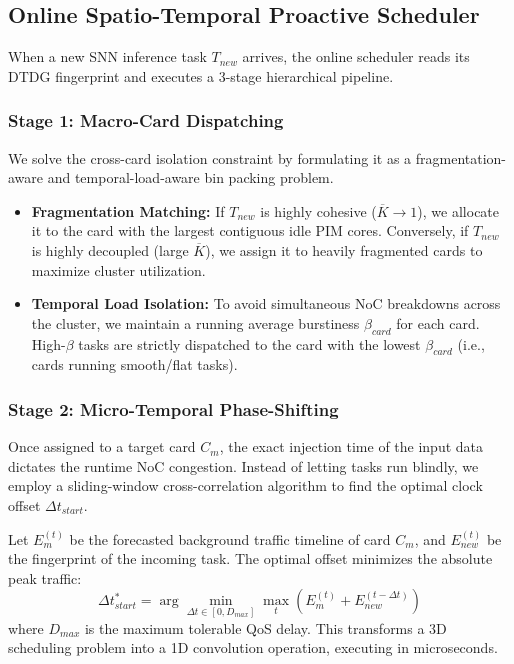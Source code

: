\documentclass[letterpaper,twocolumn,10pt]{article}
\begin{document}
\subsection{Online Spatio-Temporal Proactive Scheduler}
When a new SNN inference task $T_{new}$ arrives, the online scheduler reads its DTDG fingerprint and executes a 3-stage hierarchical pipeline.

\subsubsection{Stage 1: Macro-Card Dispatching}
We solve the cross-card isolation constraint by formulating it as a fragmentation-aware and temporal-load-aware bin packing problem.
\begin{itemize}
    \item \textbf{Fragmentation Matching:} If $T_{new}$ is highly cohesive ($\overline{K} \to 1$), we allocate it to the card with the largest contiguous idle PIM cores. Conversely, if $T_{new}$ is highly decoupled (large $\overline{K}$), we assign it to heavily fragmented cards to maximize cluster utilization.
    \item \textbf{Temporal Load Isolation:} To avoid simultaneous NoC breakdowns across the cluster, we maintain a running average burstiness $\beta_{card}$ for each card. High-$\beta$ tasks are strictly dispatched to the card with the lowest $\beta_{card}$ (i.e., cards running smooth/flat tasks).
\end{itemize}

\subsubsection{Stage 2: Micro-Temporal Phase-Shifting}
\label{sec:phase_shift}
Once assigned to a target card $C_m$, the exact injection time of the input data dictates the runtime NoC congestion. Instead of letting tasks run blindly, we employ a sliding-window cross-correlation algorithm to find the optimal clock offset $\Delta t_{start}$.

Let $E_{m}^{(t)}$ be the forecasted background traffic timeline of card $C_m$, and $E_{new}^{(t)}$ be the fingerprint of the incoming task. The optimal offset minimizes the absolute peak traffic:
\begin{equation}
    \Delta t_{start}^* = \arg\min_{\Delta t \in [0, D_{max}]} \max_{t} \left( E_{m}^{(t)} + E_{new}^{(t - \Delta t)} \right)
\end{equation}
where $D_{max}$ is the maximum tolerable QoS delay. This transforms a 3D scheduling problem into a 1D convolution operation, executing in microseconds. 
\end{document}
